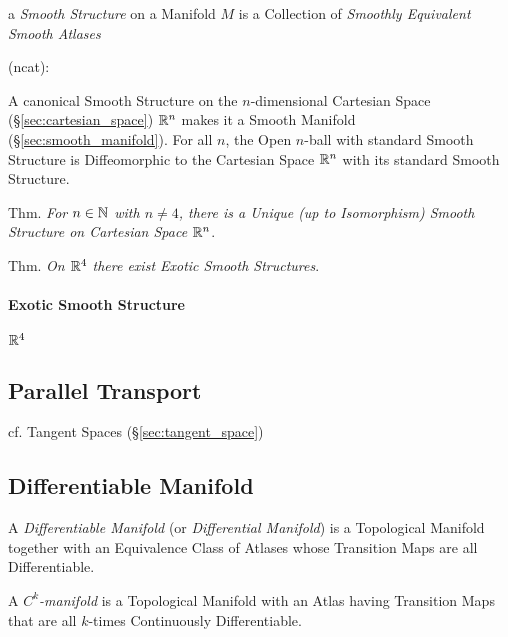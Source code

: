 a \emph{Smooth Structure} on a Manifold $M$ is a Collection of \emph{Smoothly
  Equivalent Smooth Atlases}

(ncat):

A canonical Smooth Structure on the $n$-dimensional Cartesian Space
(\S\ref{sec:cartesian_space}) $\mathbb{R}^n$ makes it a Smooth Manifold
(\S\ref{sec:smooth_manifold}). For all $n$, the Open $n$-ball with standard
Smooth Structure is Diffeomorphic to the Cartesian Space $\mathbb{R}^n$ with its
standard Smooth Structure.

Thm. \emph{For $n \in \mathbb{N}$ with $n \neq 4$, there is a Unique (up to
  Isomorphism) Smooth Structure on Cartesian Space $\mathbb{R}^n$}.

Thm. \emph{On $\mathbb{R}^4$ there exist Exotic Smooth Structures}.



\paragraph{Exotic Smooth Structure}\label{sec:smooth_structure}

$\mathbb{R}^4$



\subsection{Parallel Transport}\label{sec:parallel_transport}

\fist cf. Tangent Spaces (\S\ref{sec:tangent_space})



\subsection{Differentiable Manifold}\label{sec:differentiable_manifold}

A \emph{Differentiable Manifold} (or \emph{Differential Manifold}) is a
Topological Manifold together with an Equivalence Class of Atlases whose
Transition Maps are all Differentiable.

A \emph{$C^k$-manifold} is a Topological Manifold with an Atlas having
Transition Maps that are all $k$-times Continuously Differentiable.



